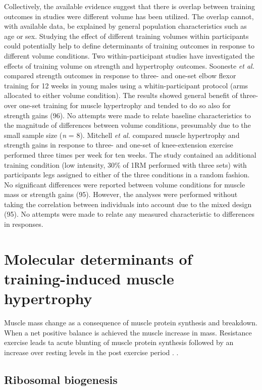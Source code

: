 \documentclass[twoside,10pt]{gihclass} %
\begin{document}
Collectively, the available evidence suggest that there is overlap between training outcomes in studies were different volume has been utilized.
The overlap cannot, with available data, be explained by general population characteristics such as age or sex.
Studying the effect of different training volumes within participants could potentially help to define determinants of training outcomes in response to different volume conditions.
Two within-participant studies have investigated the effects of training volume on strength and hypertrophy outcomes.
Sooneste \emph{et al.} compared strength outcomes in response to three- and one-set elbow flexor training for 12 weeks in young males using a whitin-participant protocol (arms allocated to either volume condition).
The results showed general benefit of three- over one-set training for muscle hypertrophy and tended to do so also for strength gains (96).
No attempts were made to relate baseline characteristics to the magnitude of differences between volume conditions, presumably due to the small sample size (\emph{n} = 8).
Mitchell \emph{et al.} compared muscle hypertrophy and strength gains in response to three- and one-set of knee-extension exercise performed three times per week for ten weeks.
The study contained an additional training condition (low intensity, 30\% of 1RM performed with three sets) with participants legs assigned to either of the three conditions in a random fashion.
No significant differences were reported between volume conditions for muscle mass or strength gains (95).
However, the analyses were performed without taking the correlation between individuals into account due to the mixed design (95).
No attempts were made to relate any measured characteristic to differences in responses.

\hypertarget{molecular-determinants-of-training-induced-muscle-hypertrophy}{%
\section{Molecular determinants of training-induced muscle hypertrophy}\label{molecular-determinants-of-training-induced-muscle-hypertrophy}}

Muscle mass change as a consequence of muscle protein synthesis and breakdown. When a net positive balance is achieved the muscle increase in mass. Resistance exercise leads ta acute blunting of muscle protein synthesis followed by an increase over resting levels in the post exercise period
.
.

\hypertarget{ribosomal-biogenesis}{%
\subsection{Ribosomal biogenesis}\label{ribosomal-biogenesis}}
\end{document}
